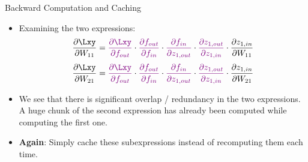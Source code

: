 \begin{frame} {Backward Computation and Caching}
  \begin{itemize}
    \item Examining the two expressions:
    $$\frac{\partial \Lxy}{\partial W_{11}} = 
       \textcolor{violet}{\frac{\partial \Lxy}{\partial f_{out}}} \cdot  \textcolor{violet}{\frac{\partial f_{out}}{\partial f_{in}}} \cdot  \textcolor{violet}{\frac{\partial f_{in}}{\partial z_{1,out}}} \cdot  \textcolor{violet}{\frac{\partial z_{1,out}}{\partial z_{1,in}}} \cdot  \textcolor{black}{\frac{\partial z_{1,in}}{\partial W_{11}}}
        $$
      $$\frac{\partial \Lxy}{\partial W_{21}} =     
 \textcolor{violet}{\frac{\partial \Lxy}{\partial f_{out}}} \cdot  \textcolor{violet}{\frac{\partial f_{out}}{\partial f_{in}}} \cdot  \textcolor{violet}{\frac{\partial f_{in}}{\partial z_{1,out}}} \cdot  \textcolor{violet}{\frac{\partial z_{1,out}}{\partial z_{1,in}}} \cdot  \textcolor{black}{\frac{\partial z_{1,in}}{\partial W_{21}}}
$$
    \item We see that there is significant overlap / redundancy in the two expressions. A huge chunk of the second expression has already been computed while computing the first one.
    \item \textbf{Again}: Simply cache these subexpressions instead of recomputing them each time.
    
  \end{itemize}
\end{frame}
